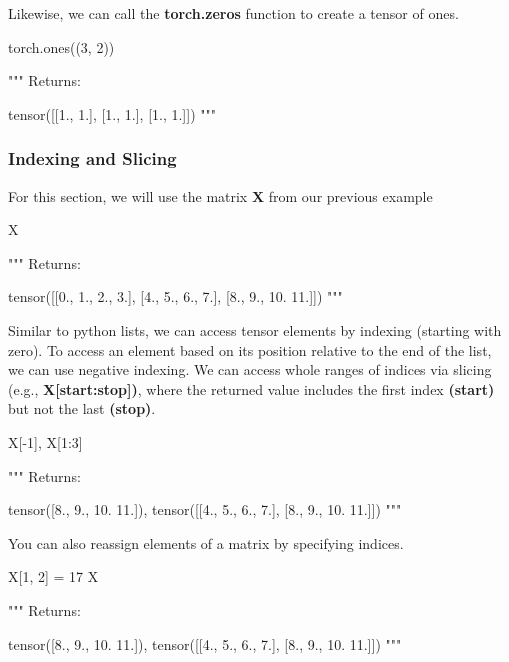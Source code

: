 \documentclass[12pt]{article}
\begin{document}
Likewise, we can call the \textbf{torch.zeros} function to create a tensor of ones.

\vspace{6pt}
\begin{python}
torch.ones((3, 2))

"""
Returns:

  tensor([[1., 1.],
    [1., 1.],
    [1., 1.]])
"""
\end{python}
\vspace{6pt}

\subsubsection{Indexing and Slicing}
For this section, we will use the matrix \textbf{X} from our previous example

\vspace{6pt}
\begin{python}
X

"""
Returns:

  tensor([[0., 1., 2., 3.],
    [4., 5., 6., 7.],
    [8., 9., 10. 11.]])
"""
\end{python}
\vspace{6pt}

Similar to python lists, we can access tensor elements by indexing (starting with zero).  To access an element based on its position relative to the end of the list, we can use negative indexing.  We can access whole ranges of indices via slicing (e.g., \textbf{X[start:stop])}, where the returned value includes the first index \textbf{(start)} but not the last \textbf{(stop)}.

\vspace{6pt}
\begin{python}
X[-1], X[1:3]

"""
Returns:

  tensor([8., 9., 10. 11.]),
  tensor([[4., 5., 6., 7.],
    [8., 9., 10. 11.]])
"""
\end{python}
\vspace{6pt}

You can also reassign elements of a matrix by specifying indices.

\vspace{6pt}
\begin{python}
X[1, 2] = 17
X

"""
Returns:

  tensor([8., 9., 10. 11.]),
  tensor([[4., 5., 6., 7.],
    [8., 9., 10. 11.]])
"""
\end{python}
\vspace{6pt}
\end{document}
